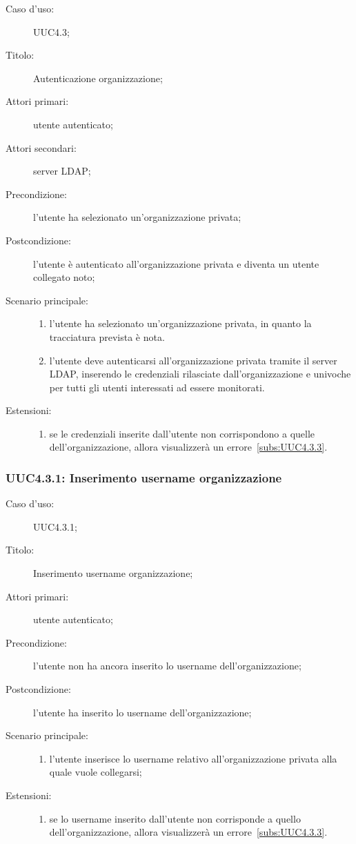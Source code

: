 \documentclass[../../../analisi-dei-requisiti.tex]{subfiles}
\begin{document}
\begin{description}
  \item[Caso d’uso:] UUC4.3;
  \item[Titolo:] Autenticazione organizzazione;
  \item[Attori primari:] utente autenticato;
  \item[Attori secondari:] server LDAP\@;
  \item[Precondizione:] l'utente ha selezionato un'organizzazione privata;
  \item[Postcondizione:] l'utente è autenticato all'organizzazione privata e diventa un utente collegato noto;
  \item[Scenario principale:]
        \begin{enumerate}
          \item l'utente ha selezionato un'organizzazione privata, in quanto la tracciatura prevista è nota.
          \item l'utente deve autenticarsi all'organizzazione privata tramite il server LDAP, inserendo le credenziali rilasciate dall'organizzazione e univoche per tutti gli utenti interessati ad essere monitorati.
        \end{enumerate}
  \item[Estensioni:]
        \begin{enumerate}
          \item se le credenziali inserite dall'utente non corrispondono a quelle dell'organizzazione, allora visualizzerà un errore~\ref{subs:UUC4.3.3}.
        \end{enumerate}
\end{description}

\subsubsection{UUC4.3.1: Inserimento username organizzazione}%
\label{subs:UUC4.3.1}
\begin{description}
  \item[Caso d’uso:] UUC4.3.1;
  \item[Titolo:] Inserimento username organizzazione;
  \item[Attori primari:] utente autenticato;
  \item[Precondizione:] l'utente non ha ancora inserito lo username dell'organizzazione;
  \item[Postcondizione:] l'utente ha inserito lo username dell'organizzazione;
  \item[Scenario principale:]
        \begin{enumerate}
          \item l'utente inserisce lo username relativo all'organizzazione privata alla quale vuole collegarsi;
        \end{enumerate}
  \item[Estensioni:]
        \begin{enumerate}
          \item se lo username inserito dall'utente non corrisponde a quello dell'organizzazione, allora visualizzerà un errore~\ref{subs:UUC4.3.3}.
        \end{enumerate}
\end{description}
\end{document}
